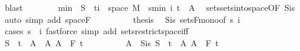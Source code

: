 \begin{isabellebody}
\ blast\isanewline
\ \ \ \ \ \ \isamarkupfalse%
\ {\isachardoublequoteopen}{\isacharquery}{\kern0pt}min\ {\isacharminus}{\kern0pt}{\isacharbackquote}{\kern0pt}\ S\ {\isasyminter}\ {\isacharparenleft}{\kern0pt}{\isacharbraceleft}{\kern0pt}ti{\isacharbraceright}{\kern0pt}\ {\isasymtimes}\ space\ M{\isacharparenright}{\kern0pt}\ {\isacharequal}{\kern0pt}\ {\isacharbraceleft}{\kern0pt}s{\isacharless}{\kern0pt}{\isachardot}{\kern0pt}{\isachardot}{\kern0pt}min\ i\ t{\isacharbraceright}{\kern0pt}\ {\isasymtimes}\ A{\isachardoublequoteclose}\ \isamarkupfalse%
\ sets{\isachardot}{\kern0pt}sets{\isacharunderscore}{\kern0pt}into{\isacharunderscore}{\kern0pt}space{\isacharbrackleft}{\kern0pt}OF\ S{\isacharunderscore}{\kern0pt}is{\isacharparenleft}{\kern0pt}{}{\isacharparenright}{\kern0pt}{\isacharbrackright}{\kern0pt}\ \isamarkupfalse%
\ {\isacharparenleft}{\kern0pt}auto\ simp\ add{\isacharcolon}{\kern0pt}\ space{\isacharunderscore}{\kern0pt}F{\isacharparenright}{\kern0pt}\isanewline
\ \ \ \ \ \ \isamarkupfalse%
\ \isamarkupfalse%
\ {\isacharquery}{\kern0pt}thesis\ \isamarkupfalse%
\ S{\isacharunderscore}{\kern0pt}is\ sets{\isacharunderscore}{\kern0pt}F{\isacharunderscore}{\kern0pt}mono{\isacharbrackleft}{\kern0pt}of\ s\ i{\isacharbrackright}{\kern0pt}\ \isamarkupfalse%
\ {\isacharparenleft}{\kern0pt}cases\ {\isachardoublequoteopen}s\ {\isasymle}\ i{\isachardoublequoteclose}{\isacharparenright}{\kern0pt}\ {\isacharparenleft}{\kern0pt}fastforce\ simp\ add{\isacharcolon}{\kern0pt}\ sets{\isacharunderscore}{\kern0pt}restrict{\isacharunderscore}{\kern0pt}space{\isacharunderscore}{\kern0pt}iff{\isacharparenright}{\kern0pt}{\isacharplus}{\kern0pt}\isanewline
\ \ \ \ \isamarkupfalse%
\isanewline
\ \ \ \ \ \ \isamarkupfalse%
\ {\isachardoublequoteopen}S\ {\isasymin}\ {\isacharbraceleft}{\kern0pt}{\isacharbraceleft}{\kern0pt}t\ {\isasymtimes}\ A\ {\isacharbar}{\kern0pt}\ A{\isachardot}{\kern0pt}\ A\ {\isasymin}\ F\ t\isanewline
\ \ \ \ \ \ \isamarkupfalse%
\ \isamarkupfalse%
\ A\ \ S{\isacharunderscore}{\kern0pt}is{\isacharcolon}{\kern0pt}\ {\isachardoublequoteopen}S\ {\isacharequal}{\kern0pt}\ {\isacharbraceleft}{\kern0pt}t\ {\isasymtimes}\ A{\isachardoublequoteclose}\ {\isachardoublequoteopen}A\ {\isasymin}\ F\ t\ \isamarkupfalse%

\end{isabellebody}
